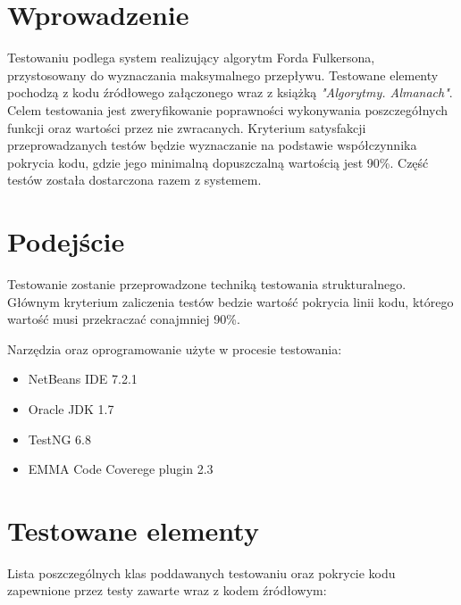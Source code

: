 \documentclass[10pt]{dokument-tiwo}
\begin{document}
\MakeDokumentMeta


\section{Wprowadzenie}
    Testowaniu podlega system realizujący algorytm Forda Fulkersona, przystosowany do wyznaczania maksymalnego przepływu. Testowane elementy pochodzą 
z kodu źródłowego załączonego wraz z książką \emph{"Algorytmy. Almanach"}. Celem testowania jest zweryfikowanie poprawności wykonywania poszczegółnych 
funkcji oraz wartości przez nie zwracanych. Kryterium satysfakcji przeprowadzanych testów będzie wyznaczanie na podstawie współczynnika pokrycia kodu, gdzie 
jego minimalną dopuszczalną wartością jest 90\%. Część testów została dostarczona razem z systemem.  

\section{Podejście}
    Testowanie zostanie przeprowadzone techniką testowania strukturalnego. Głównym kryterium zaliczenia testów bedzie wartość pokrycia linii kodu, którego
 wartość musi przekraczać conajmniej 90\%.

    Narzędzia oraz oprogramowanie użyte w procesie testowania:
    \begin{itemize}
        \item NetBeans IDE 7.2.1
        \item Oracle JDK 1.7
        \item TestNG 6.8
        \item EMMA Code Coverege plugin 2.3
    \end{itemize}

\section{Testowane elementy}
    Lista poszczególnych klas poddawanych testowaniu oraz pokrycie kodu zapewnione przez testy zawarte wraz z kodem źródłowym:
\end{document}
